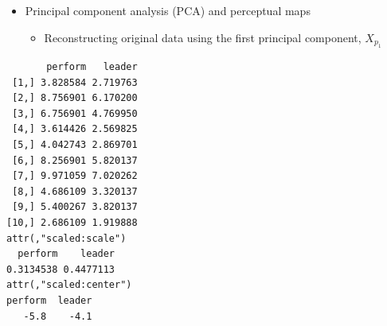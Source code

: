 \documentclass[
  ignorenonframetext,
]{beamer}
\newenvironment{Shaded}{\begin{snugshade}}{\end{snugshade}}
\newcommand{\AttributeTok}[1]{\textcolor[rgb]{0.40,0.45,0.13}{#1}}
\newcommand{\ConstantTok}[1]{\textcolor[rgb]{0.56,0.35,0.01}{#1}}
\newcommand{\DecValTok}[1]{\textcolor[rgb]{0.68,0.00,0.00}{#1}}
\newcommand{\FunctionTok}[1]{\textcolor[rgb]{0.28,0.35,0.67}{#1}}
\newcommand{\NormalTok}[1]{\textcolor[rgb]{0.00,0.23,0.31}{#1}}
\newcommand{\SpecialCharTok}[1]{\textcolor[rgb]{0.37,0.37,0.37}{#1}}
\providecommand{\tightlist}{%
  \setlength{\itemsep}{0pt}\setlength{\parskip}{0pt}}\usepackage{longtable,booktabs,array}
\begin{document}
\begin{frame}[fragile]{}
\label{section-38}
\begin{itemize}
\item
  Principal component analysis (PCA) and perceptual maps

  \begin{itemize}
  \tightlist
  \item
    Reconstructing original data using the first principal component,
    \(X_{p_1}\)
  \end{itemize}
\end{itemize}

\tiny

\begin{Shaded}
\end{Shaded}

\begin{verbatim}
       perform   leader
 [1,] 3.828584 2.719763
 [2,] 8.756901 6.170200
 [3,] 6.756901 4.769950
 [4,] 3.614426 2.569825
 [5,] 4.042743 2.869701
 [6,] 8.256901 5.820137
 [7,] 9.971059 7.020262
 [8,] 4.686109 3.320137
 [9,] 5.400267 3.820137
[10,] 2.686109 1.919888
attr(,"scaled:scale")
  perform    leader 
0.3134538 0.4477113 
attr(,"scaled:center")
perform  leader 
   -5.8    -4.1 
\end{verbatim}
\end{frame}
\end{document}
